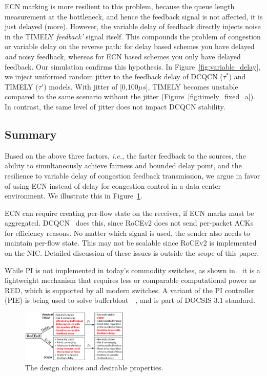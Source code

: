 ECN marking is more resilient to this problem, because the queue length measurement at the 
bottleneck, and hence the feedback signal is not affected, it
is just delayed (more). However, the variable delay
of feedback directly injects noise in the TIMELY \emph{feedback'}
signal itself. This
compounds the problem of congestion or variable delay on the reverse
path: for delay based schemes you have
delayed \emph{and} noisy feedback, whereas for ECN based schemes you only have delayed feedback.
Our simulation confirms this hypothesis. In Figure~\ref{fig:variable_delay}, we inject 
uniformed random jitter to the feedback delay of DCQCN ($\tau^*$) 
and TIMELY ($\tau '$) models. With jitter of [0,100$\mu s$],
TIMELY becomes unstable compared to the same scenario without the jitter
(Figure~\ref{fig:timely_fixed_a}). In contrast, the same level of
jitter does not impact DCQCN stability.
\vspace{-0.5em}
\subsection{Summary}
Based on the above three factors, {\em i.e.,} the faster feedback to the sources, 
the ability to simultaneously achieve fairness and bounded delay point, and the resilience 
to variable delay of congestion feedback transmission, we argue
in favor of using ECN instead of delay for congestion control in a data center
environment. We illustrate this in Figure~\ref{fig:design_choice}.

ECN can require creating per-flow state on the receiver, if ECN marks must be
aggregated. DCQCN~\cite{dcqcn} does this, since RoCEv2 does not send per-packet
ACKs for efficiency reasons. No matter which signal is used, the sender also needs
to maintain per-flow state. This may not be scalable since
RoCEv2 is implemented on the NIC.  
Detailed discussion of these issues is outside the scope of this paper.

While PI is not implemented in today's commodity switches, as shown
in~\cite{hollot2001designing}~it is a lightweight mechanism that requires less
or comparable computational power as RED, which is supported by all modern
switches. A variant of the PI controller (PIE) is being used to solve
bufferbloat~\cite{conf/hpsr/PanNPPSBV13,bufferbloat-pi}~, and is part of DOCSIS 3.1
standard.

\begin{figure}[t]
 \center
\includegraphics[width=0.45\textwidth]{figures/design_choice.eps}
\vspace{-0.5em}
 \caption{The design choices and desirable properties.}
\label{fig:design_choice}
\end{figure}

